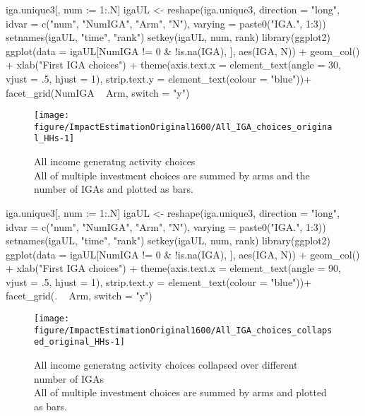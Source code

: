 \begin{Schunk}
\begin{Sinput}
iga.unique3[, num := 1:.N]
igaUL <- reshape(iga.unique3, direction = "long", idvar = c("num", "NumIGA", "Arm", "N"),
  varying = paste0("IGA.", 1:3))
setnames(igaUL, "time", "rank")
setkey(igaUL, num, rank)
library(ggplot2)
ggplot(data = igaUL[NumIGA != 0 & !is.na(IGA), ], aes(IGA, N)) + 
  geom_col() +
  xlab("First IGA choices") +
  theme(axis.text.x = element_text(angle = 30, vjust = .5, hjust = 1), 
    strip.text.y = element_text(colour = "blue"))+
  facet_grid(NumIGA ~ Arm, switch = "y")
\end{Sinput}
\begin{figure}

{\centering \texttt{[image: figure/ImpactEstimationOriginal1600/All\_IGA\_choices\_original\_HHs-1]} 

}

\caption{All income generatng activity choices\\ {\footnotesize All of multiple investment choices are summed by arms and the number of IGAs and plotted as bars. \setlength{\baselineskip}{8pt}}}\label{Figure All IGA choices original HHs}
\end{figure}
\end{Schunk}
\begin{Schunk}
\begin{Sinput}
iga.unique3[, num := 1:.N]
igaUL <- reshape(iga.unique3, direction = "long", idvar = c("num", "NumIGA", "Arm", "N"),
  varying = paste0("IGA.", 1:3))
setnames(igaUL, "time", "rank")
setkey(igaUL, num, rank)
library(ggplot2)
ggplot(data = igaUL[NumIGA != 0 & !is.na(IGA), ], aes(IGA, N)) + 
  geom_col() +
  xlab("First IGA choices") +
  theme(axis.text.x = element_text(angle = 90, vjust = .5, hjust = 1), 
    strip.text.y = element_text(colour = "blue"))+
  facet_grid(. ~ Arm, switch = "y")
\end{Sinput}
\begin{figure}

{\centering \texttt{[image: figure/ImpactEstimationOriginal1600/All\_IGA\_choices\_collapsed\_original\_HHs-1]} 

}

\caption{All income generatng activity choices collapsed over different number of IGAs\\ {\footnotesize All of multiple investment choices are summed by arms and plotted as bars. \setlength{\baselineskip}{8pt}}}\label{Figure All IGA choices collapsed original HHs}
\end{figure}
\end{Schunk}

